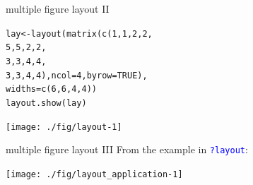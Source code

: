 \documentclass[xcolor=table,           xcolor=dvipsnames]{beamer}\usepackage[]{graphicx}\usepackage[]{color}
\makeatletter
\newcommand{\hlnum}[1]{\textcolor[rgb]{0,0,0}{#1}}
\newcommand{\hlstd}[1]{\textcolor[rgb]{0,0,0}{#1}}
\newcommand{\hlkwb}[1]{\textcolor[rgb]{0,0,0}{#1}}
\newcommand{\hlkwc}[1]{\textcolor[rgb]{1,0,1}{#1}}
\newcommand{\hlkwd}[1]{\textcolor[rgb]{0,0,1}{#1}}
\newenvironment{kframe}{%
 \def\at@end@of@kframe{}%
 \ifinner\ifhmode%
  \def\at@end@of@kframe{\end{minipage}}%
  \begin{minipage}{\columnwidth}%
 \fi\fi%
 \def\FrameCommand##1{\hskip\@totalleftmargin \hskip-\fboxsep
 \colorbox{shadecolor}{##1}\hskip-\fboxsep
     \hskip-\linewidth \hskip-\@totalleftmargin \hskip\columnwidth}%
 \MakeFramed {\advance\hsize-\width
   \@totalleftmargin\z@ \linewidth\hsize
   \@setminipage}}%
 {\par\unskip\endMakeFramed%
 \at@end@of@kframe}
\newenvironment{knitrout}{}{} %
\newcommand{\rcode}[1]{\texttt{\textcolor{Blue}{#1}}} %
\makeatother
\begin{document}

\begin{frame}[fragile]{multiple figure layout II}
\vspace{-1.5em}
\begin{knitrout}\footnotesize
{}\color{fgcolor}\begin{kframe}
\begin{alltt}
\hlstd{lay} \hlkwb{<-} \hlkwd{layout}\hlstd{(}\hlkwd{matrix}\hlstd{(}\hlkwd{c}\hlstd{(}\hlnum{1}\hlstd{,}\hlnum{1}\hlstd{,}\hlnum{2}\hlstd{,}\hlnum{2}\hlstd{,}
                       \hlnum{5}\hlstd{,}\hlnum{5}\hlstd{,}\hlnum{2}\hlstd{,}\hlnum{2}\hlstd{,}
                       \hlnum{3}\hlstd{,}\hlnum{3}\hlstd{,}\hlnum{4}\hlstd{,}\hlnum{4}\hlstd{,}
                       \hlnum{3}\hlstd{,}\hlnum{3}\hlstd{,}\hlnum{4}\hlstd{,}\hlnum{4}\hlstd{),} \hlkwc{ncol}\hlstd{=}\hlnum{4}\hlstd{,} \hlkwc{byrow}\hlstd{=}\hlnum{TRUE}\hlstd{),}
              \hlkwc{widths}\hlstd{=}\hlkwd{c}\hlstd{(}\hlnum{6}\hlstd{,}\hlnum{6}\hlstd{,}\hlnum{4}\hlstd{,}\hlnum{4}\hlstd{))}
\hlkwd{layout.show}\hlstd{(lay)}
\end{alltt}
\end{kframe}

{\centering \texttt{[image: ./fig/layout-1]} 

}



\end{knitrout}
\end{frame}


\begin{frame}[fragile]{multiple figure layout III}
From the example in \rcode{?layout}:\\
\vspace{-1em}
\begin{knitrout}
\color{fgcolor}

{\centering \texttt{[image: ./fig/layout\_application-1]} 

}



\end{knitrout}
\end{frame}



\end{document}
